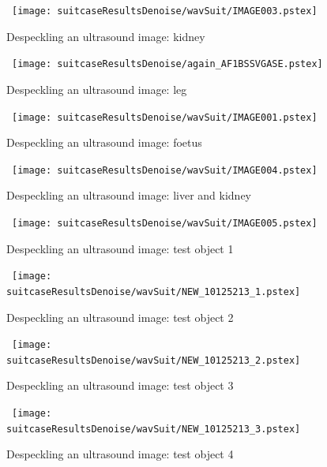 \documentclass[12pt]{report}
\begin{document}
\begin{figure}[p]
	\centerline{ \hbox{
        	\texttt{[image: suitcaseResultsDenoise/wavSuit/IMAGE003.pstex]}
	}}
	\caption{Despeckling an ultrasound image: kidney}
	\label{kidneyUS}
\end{figure}

\begin{figure}[p]
	\centerline{ \hbox{
        	\texttt{[image: suitcaseResultsDenoise/again\_AF1BSSVGASE.pstex]}
	}}
        \caption{Despeckling an ultrasound image: leg}
	\label{legUS}
\end{figure}

\begin{figure}[p]
\centerline{ \hbox{
        \texttt{[image: suitcaseResultsDenoise/wavSuit/IMAGE001.pstex]} \\
}}
	\caption{Despeckling an ultrasound image: foetus}
	\label{fetusUS}
\end{figure}

\begin{figure}[p]
\centerline{ \hbox{
        \texttt{[image: suitcaseResultsDenoise/wavSuit/IMAGE004.pstex]}
}}
	\caption{Despeckling an ultrasound image: liver and kidney}
	\label{liverAndKidneyUS}
\end{figure}

\begin{figure}[p]
\centerline{ \hbox{
       \texttt{[image: suitcaseResultsDenoise/wavSuit/IMAGE005.pstex]}
}}
	\caption{Despeckling an ultrasound image: test object 1}
	\label{test1US}
\end{figure}

\begin{figure}[p]
\centerline{ \hbox{
        \texttt{[image: suitcaseResultsDenoise/wavSuit/NEW\_10125213\_1.pstex]}
}}
	\caption{Despeckling an ultrasound image: test object 2}
	\label{test2US}
\end{figure}

\begin{figure}[p]
\centerline{ \hbox{
        \texttt{[image: suitcaseResultsDenoise/wavSuit/NEW\_10125213\_2.pstex]}
}}
	\caption{Despeckling an ultrasound image: test object 3}
	\label{test3US}
\end{figure}

\begin{figure}[p]
\centerline{ \hbox{
        \texttt{[image: suitcaseResultsDenoise/wavSuit/NEW\_10125213\_3.pstex]}
}}
	\caption{Despeckling an ultrasound image: test object 4}
	\label{test4US}
\end{figure}
\end{document}
